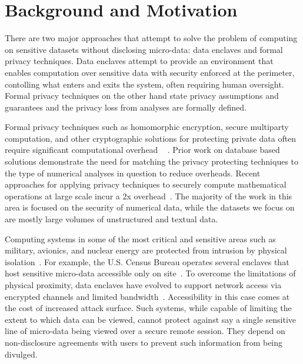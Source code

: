 \section{Background and Motivation} \label{sec:background}

There are two major approaches that attempt to solve the problem of computing on sensitive
datasets without disclosing micro-data: data enclaves and formal privacy techniques. Data enclaves attempt to
provide an environment that enables computation over sensitive data with security enforced
at the perimeter, contolling what enters and exits the system, often requiring human oversight.
Formal privacy techniques on the other hand state privacy assumptions and guarantees and the privacy loss
from analyses are formally defined.

Formal privacy techniques such as homomorphic encryption, secure multiparty computation, and
other cryptographic solutions for protecting private data often require significant computational
overhead ~\cite{gentry2012fully} \cite{naehrig2011can}. Prior work on database based solutions
\cite{popa2011cryptdb} demonstrate the need for matching the privacy protecting techniques to the type of
numerical analyses in question to reduce overheads. Recent approaches for applying privacy techniques to
securely compute mathematical operations at large scale incur a 2x overhead~\cite{kepner2014computing}.
The majority of the work in this area is focused on the security of numerical data, while the datasets
we focus on are mostly large volumes of unstructured and textual data.

Computing systems in some of the most critical and sensitive areas such as military, avionics,
and nuclear energy are protected from intrusion by physical isolation~\cite{byres2013air, ross2013security}.
For example, the U.S. Census Bureau operates several enclaves that host sensitive micro-data accessible
only on site~\cite{rdc_uscensus}. To overcome the limitations of physical proximity, data enclaves
have evolved to support network access via encrypted channels and limited bandwidth~\cite{lane2008using, grossman2016toward}.
Accessibility in this case comes at the cost of increased attack surface. Such systems, while
capable of limiting the extent to which data can be viewed, cannot protect against say a single
sensitive line of micro-data being viewed over a secure remote session. They depend on non-disclosure
agreements with users to prevent such information from being divulged.

